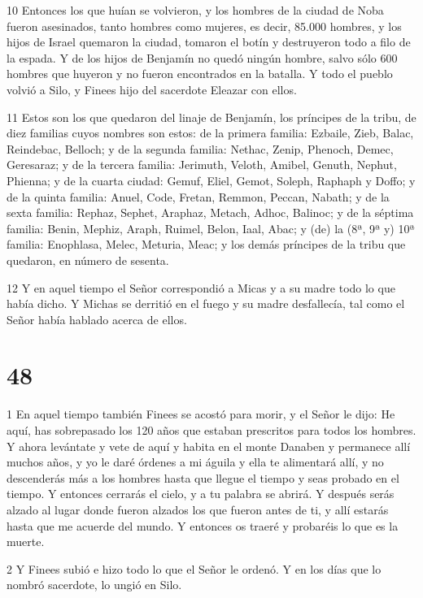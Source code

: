 \par 10 Entonces los que huían se volvieron, y los hombres de la ciudad de Noba fueron asesinados, tanto hombres como mujeres, es decir, 85.000 hombres, y los hijos de Israel quemaron la ciudad, tomaron el botín y destruyeron todo a filo de la espada. Y de los hijos de Benjamín no quedó ningún hombre, salvo sólo 600 hombres que huyeron y no fueron encontrados en la batalla. Y todo el pueblo volvió a Silo, y Finees hijo del sacerdote Eleazar con ellos.

\par 11 Estos son los que quedaron del linaje de Benjamín, los príncipes de la tribu, de diez familias cuyos nombres son estos: de la primera familia: Ezbaile, Zieb, Balac, Reindebac, Belloch; y de la segunda familia: Nethac, Zenip, Phenoch, Demec, Geresaraz; y de la tercera familia: Jerimuth, Veloth, Amibel, Genuth, Nephut, Phienna; y de la cuarta ciudad: Gemuf, Eliel, Gemot, Soleph, Raphaph y Doffo; y de la quinta familia: Anuel, Code, Fretan, Remmon, Peccan, Nabath; y de la sexta familia: Rephaz, Sephet, Araphaz, Metach, Adhoc, Balinoc; y de la séptima familia: Benin, Mephiz, Araph, Ruimel, Belon, Iaal, Abac; y (de) la (8ª, 9ª y) 10ª familia: Enophlasa, Melec, Meturia, Meac; y los demás príncipes de la tribu que quedaron, en número de sesenta.

\par 12 Y en aquel tiempo el Señor correspondió a Micas y a su madre todo lo que había dicho. Y Michas se derritió en el fuego y su madre desfallecía, tal como el Señor había hablado acerca de ellos.

\chapter{48}

\par 1 En aquel tiempo también Finees se acostó para morir, y el Señor le dijo: He aquí, has sobrepasado los 120 años que estaban prescritos para todos los hombres. Y ahora levántate y vete de aquí y habita en el monte Danaben y permanece allí muchos años, y yo le daré órdenes a mi águila y ella te alimentará allí, y no descenderás más a los hombres hasta que llegue el tiempo y seas probado en el tiempo. Y entonces cerrarás el cielo, y a tu palabra se abrirá. Y después serás alzado al lugar donde fueron alzados los que fueron antes de ti, y allí estarás hasta que me acuerde del mundo. Y entonces os traeré y probaréis lo que es la muerte.

\par 2 Y Finees subió e hizo todo lo que el Señor le ordenó. Y en los días que lo nombró sacerdote, lo ungió en Silo.

